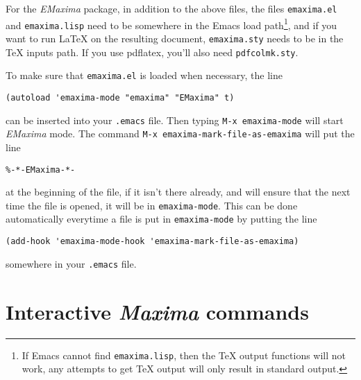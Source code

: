 \documentclass{article}
\newcommand{\emx}{\textsl{\sffamily EMaxima}}
\newcommand{\mx}{\textsl{\sffamily Maxima}}
\begin{document}
For the \emx{} package, in addition to the above files, the files
\texttt{emaxima.el} and \texttt{emaxima.lisp} need to be somewhere in
the Emacs load path\footnote{If Emacs cannot find
  \texttt{emaxima.lisp}, then the \TeX{} output functions will not
  work, any attempts to get \TeX{} output will only result in standard
  output.}, and if you want to run \LaTeX{} on the resulting document,
\texttt{emaxima.sty} needs to be in the \TeX{} inputs path.  If you
use pdflatex, you'll also need \texttt{pdfcolmk.sty}.

To make sure that \texttt{emaxima.el} is loaded when necessary, the line
\begin{verbatim}
(autoload 'emaxima-mode "emaxima" "EMaxima" t)
\end{verbatim}
\noindent
can be inserted into your \texttt{.emacs} file.  Then typing
\texttt{M-x emaxima-mode} will start \emx{} mode.  The command 
\texttt{M-x emaxima-mark-file-as-emaxima} will put the line
\begin{verbatim}
%-*-EMaxima-*-
\end{verbatim}
\noindent
at the beginning of the file, if it isn't there already, and will ensure
that the next time the file is opened, it will be in \texttt{emaxima-mode}.  
This can be done automatically everytime a file is put in
\texttt{emaxima-mode} by putting the line
\begin{verbatim}
(add-hook 'emaxima-mode-hook 'emaxima-mark-file-as-emaxima)
\end{verbatim}
\noindent
somewhere in your \texttt{.emacs} file.

\section{Interactive \mx{} commands}
\label{app:intmx}

\smallskip
\end{document}
